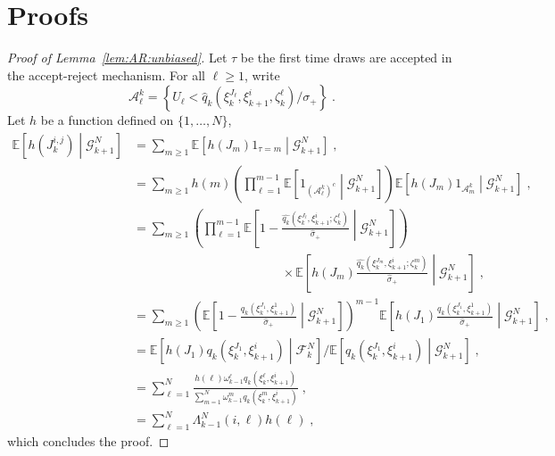 \documentclass[12pt]{article}
\newcommand{\eqsp}{\;}
\newcommand{\1}{\mathrm{1}}
\begin{document}
\section{Proofs}
\label{sec:append:proofs}
\begin{proof}[Proof of Lemma~\ref{lem:AR:unbiased}]
Let $\tau$ be the first time  draws are accepted in the accept-reject mechanism. For all $\ell\ge 1$, write
\[
\mathcal{A}^k_{\ell} = \left\{U_\ell<\widehat{q}_{k}(\xi_{k}^{J_\ell},\xi_{k+1}^{i},\zeta^{\ell}_{k})/\sigma_+\right\}\eqsp.
\]
Let $h$ be a function defined on $\{1,\ldots,N\}$,
\begin{align*}
\mathbb{E}\left[h(J^{i,j}_k)\middle| \mathcal{G}_{k+1}^N\right] & = \sum_{m\ge 1}\mathbb{E}\left[h(J_m)\1_{\tau=m}\middle| \mathcal{G}_{k+1}^N\right]\eqsp,\\
& = \sum_{m\ge 1}h(m)\left(\prod_{\ell=1}^{m-1}\mathbb{E}\left[\1_{(\mathcal{A}^k_{\ell})^c}\middle| \mathcal{G}_{k+1}^N\right]\right)\mathbb{E}\left[h(J_m)\1_{\mathcal{A}^k_{m}}\middle| \mathcal{G}_{k+1}^N\right]\eqsp,\\
& = \sum_{m\ge 1}\left(\prod_{\ell=1}^{m-1}\mathbb{E}\left[1-\frac{\widehat{q_k}(\xi_{k}^{J_\ell},\xi_{k+1}^{i};\zeta_k^{\ell})}{\hat{\sigma}_{+}}\middle| \mathcal{G}_{k+1}^N\right]\right)\\
&\hspace{5cm}\times\mathbb{E}\left[h(J_m)\frac{\widehat{q_k}(\xi_{k}^{J_m},\xi_{k+1}^{i};\zeta_k^{m})}{\hat{\sigma}_{+}}\middle| \mathcal{G}_{k+1}^N\right]\eqsp,\\
& = \sum_{m\ge 1}\left(\mathbb{E}\left[1-\frac{q_k(\xi_{k}^{J_1},\xi_{k+1}^{1})}{\hat{\sigma}_{+}}\middle| \mathcal{G}_{k+1}^N\right]\right)^{m-1}\mathbb{E}\left[h(J_1)\frac{q_k(\xi_{k}^{J_1},\xi_{k+1}^{1})}{\hat{\sigma}_{+}}\middle| \mathcal{G}_{k+1}^N\right]\eqsp,\\
& = \mathbb{E}\left[h(J_1)q_k(\xi_{k}^{J_1},\xi_{k+1}^{i})\middle| \mathcal{F}_k^N\right]/\mathbb{E}\left[q_k(\xi_{k}^{J_1},\xi_{k+1}^{i})\middle| \mathcal{G}_{k+1}^N\right]\eqsp,\\
& = \sum_{\ell=1}^N \frac{h(\ell)\omega_{k-1}^{\ell}q_k(\xi_{k}^{\ell},\xi_{k+1}^{i})}{\sum_{m=1}^N\omega_{k-1}^{m}q_k(\xi_{k}^{m},\xi_{k+1}^{i})}\eqsp,\\
&= \sum_{\ell=1}^N \Lambda_{k-1}^N(i,\ell)h(\ell) \eqsp,
\end{align*}
which concludes the proof.


\end{proof}
\end{document}
